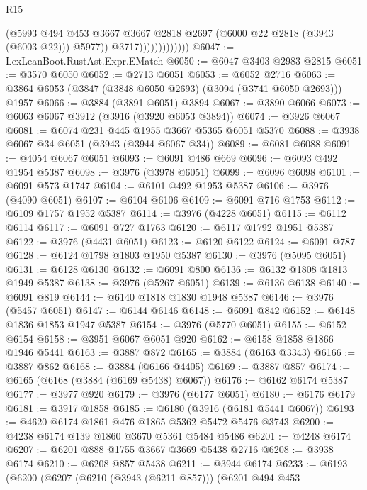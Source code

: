 \begin{lexlean}{R15}
\begin{coremodule}
                                (@5993
                                  @494
                                  @453
                                  @3667
                                  @3667
                                  @2818
                                  @2697
                                  (@6000 @22 @2818 (@3943 (@6003 @22)))
                                  @5977))
                              @3717)))))))))))))
@6047 := LexLeanBoot.RustAst.Expr.EMatch
@6050 := @6047 @3403 @2983 @2815
@6051 := @3570 @6050
@6052 := @2713 @6051
@6053 := @6052 @2716
@6063 := @3864 @6053 (@3847 (@3848 @6050 @2693) (@3094 (@3741 @6050 @2693))) @1957
@6066 := @3884 (@3891 @6051) @3894
@6067 := @3890 @6066
@6073 := @6063 @6067 @3912 (@3916 (@3920 @6053 @3894))
@6074 := @3926 @6067
@6081 := @6074 @231 @445 @1955 @3667 @5365 @6051 @5370
@6088 := @3938 @6067 @34 @6051 (@3943 (@3944 @6067 @34))
@6089 := @6081 @6088
@6091 := @4054 @6067 @6051
@6093 := @6091 @486 @669
@6096 := @6093 @492 @1954 @5387
@6098 := @3976 (@3978 @6051)
@6099 := @6096 @6098
@6101 := @6091 @573 @1747
@6104 := @6101 @492 @1953 @5387
@6106 := @3976 (@4090 @6051)
@6107 := @6104 @6106
@6109 := @6091 @716 @1753
@6112 := @6109 @1757 @1952 @5387
@6114 := @3976 (@4228 @6051)
@6115 := @6112 @6114
@6117 := @6091 @727 @1763
@6120 := @6117 @1792 @1951 @5387
@6122 := @3976 (@4431 @6051)
@6123 := @6120 @6122
@6124 := @6091 @787
@6128 := @6124 @1798 @1803 @1950 @5387
@6130 := @3976 (@5095 @6051)
@6131 := @6128 @6130
@6132 := @6091 @800
@6136 := @6132 @1808 @1813 @1949 @5387
@6138 := @3976 (@5267 @6051)
@6139 := @6136 @6138
@6140 := @6091 @819
@6144 := @6140 @1818 @1830 @1948 @5387
@6146 := @3976 (@5457 @6051)
@6147 := @6144 @6146
@6148 := @6091 @842
@6152 := @6148 @1836 @1853 @1947 @5387
@6154 := @3976 (@5770 @6051)
@6155 := @6152 @6154
@6158 := @3951 @6067 @6051 @920
@6162 := @6158 @1858 @1866 @1946 @5441
@6163 := @3887 @872
@6165 := @3884 (@6163 @3343)
@6166 := @3887 @862
@6168 := @3884 (@6166 @4405)
@6169 := @3887 @857
@6174 := @6165 (@6168 (@3884 (@6169 @5438) @6067))
@6176 := @6162 @6174 @5387
@6177 := @3977 @920
@6179 := @3976 (@6177 @6051)
@6180 := @6176 @6179
@6181 := @3917 @1858
@6185 := @6180 (@3916 (@6181 @5441 @6067))
@6193 := @4620 @6174 @1861 @476 @1865 @5362 @5472 @5476 @3743
@6200 := @4238 @6174 @139 @1860 @3670 @5361 @5484 @5486
@6201 := @4248 @6174
@6207 := @6201 @888 @1755 @3667 @3669 @5438 @2716
@6208 := @3938 @6174
@6210 := @6208 @857 @5438
@6211 := @3944 @6174
@6233 := @6193
    (@6200
      (@6207
        (@6210 (@3943 (@6211 @857)))
        (@6201
          @494
          @453

\end{coremodule}
\end{lexlean}
